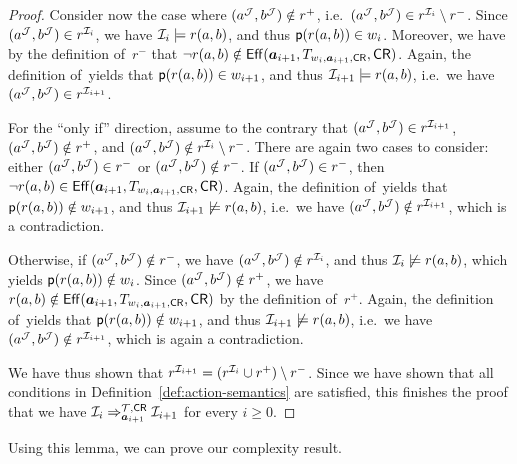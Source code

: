 \begin{proof}
    Consider now the case where $(a^\mathcal{J},b^\mathcal{J})\notin r^+$,
    i.e.~$(a^\mathcal{J},b^\mathcal{J})\in r^{\mathcal{I}_i}\setminus r^-$.  Since
    $(a^\mathcal{J},b^\mathcal{J})\in r^{\mathcal{I}_i}$, we have $\mathcal{I}_i\models r(a,b)$, and thus
    $\mathsf{p}(r(a,b))\in w_i$.  Moreover, we have by the definition of~$r^-$ that
    $\lnot r(a,b)\notin\operatorname{\mathsf{Eff}}(\boldsymbol a_{i+1},T_{w_i,\boldsymbol a_{i+1},\mathsf{CR}},\mathsf{CR})$.  Again, the
    definition of~\Deltah yields that $\mathsf{p}(r(a,b))\in w_{i+1}$, and thus
    $\mathcal{I}_{i+1}\models r(a,b)$, i.e.~we have
    $(a^\mathcal{J},b^\mathcal{J})\in r^{\mathcal{I}_{i+1}}$.

    For the \enquote{only if} direction, assume to the contrary that
    $(a^\mathcal{J},b^\mathcal{J})\in r^{\mathcal{I}_{i+1}}$, $(a^\mathcal{J},b^\mathcal{J})\notin r^+$, and
    $(a^\mathcal{J},b^\mathcal{J})\notin r^{\mathcal{I}_i}\setminus r^-$.  There are again two cases
    to consider: either $(a^\mathcal{J},b^\mathcal{J})\in r^-$ or $(a^\mathcal{J},b^\mathcal{J})\notin r^-$.
    If $(a^\mathcal{J},b^\mathcal{J})\in r^-$, then
    $\lnot r(a,b)\in\operatorname{\mathsf{Eff}}(\boldsymbol a_{i+1},T_{w_i,\boldsymbol a_{i+1},\mathsf{CR}},\mathsf{CR})$.  Again, the
    definition of~\Deltah yields that $\mathsf{p}(r(a,b))\notin w_{i+1}$, and thus
    $\mathcal{I}_{i+1}\not\models r(a,b)$, i.e.~we have
    $(a^\mathcal{J},b^\mathcal{J})\notin r^{\mathcal{I}_{i+1}}$, which is a contradiction.

    Otherwise, if $(a^\mathcal{J},b^\mathcal{J})\notin r^-$, we have
    $(a^\mathcal{J},b^\mathcal{J})\notin r^{\mathcal{I}_i}$, and thus $\mathcal{I}_i\not\models r(a,b)$,
    which yields $\mathsf{p}(r(a,b))\notin w_i$.  Since $(a^\mathcal{J},b^\mathcal{J})\notin r^+$,
    we have
    $r(a,b)\notin\operatorname{\mathsf{Eff}}(\boldsymbol a_{i+1},T_{w_i,\boldsymbol a_{i+1},\mathsf{CR}},\mathsf{CR})$
    by the definition of~$r^+$.  Again, the definition of~\Deltah yields that
    $\mathsf{p}(r(a,b))\notin w_{i+1}$, and thus $\mathcal{I}_{i+1}\not\models r(a,b)$,
    i.e.~we have $(a^\mathcal{J},b^\mathcal{J})\notin r^{\mathcal{I}_{i+1}}$, which is again a
    contradiction.

    We have thus shown that
    $r^{\mathcal{I}_{i+1}}=(r^{\mathcal{I}_i}\cup r^+)\setminus r^-$.
    Since we have shown that all conditions in Definition~\ref{def:action-semantics}
    are satisfied, this finishes the proof that we have
    $\mathcal{I}_i\Rightarrow_{\boldsymbol a_{i+1}}^{\mathcal{T},\mathsf{CR}}\mathcal{I}_{i+1}$ for every $i\ge 0$.
\end{proof}

\noindent
Using this lemma, we can prove our complexity result.

